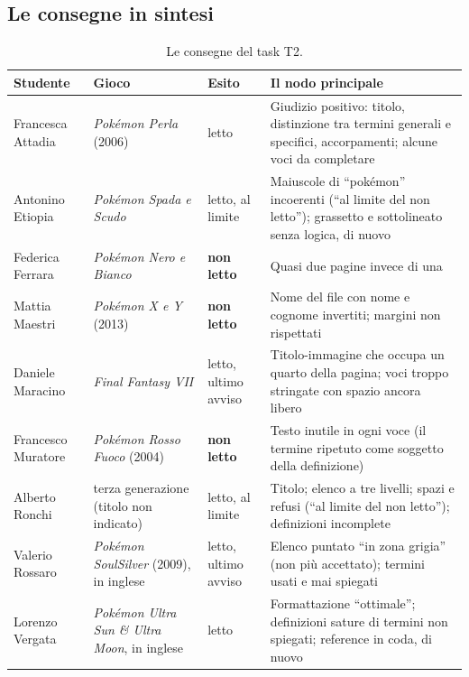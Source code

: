\subsection{Le consegne in sintesi}

\begin{table}[htbp]
  \centering
  \caption{Le consegne del task T2.}
  \label{rv:t2:tab:consegne}
  \small
  \begin{tabular}{@{}p{2.3cm}p{2.8cm}p{1.3cm}p{5.0cm}@{}}
    \toprule
    \textbf{Studente} & \textbf{Gioco} & \textbf{Esito} &
    \textbf{Il nodo principale} \\
    \midrule
    Francesca Attadia & \emph{Pokémon Perla} (2006) & letto &
      Giudizio positivo: titolo, distinzione tra termini generali e
      specifici, accorpamenti; alcune voci da completare \\
    \addlinespace
    Antonino Etiopia & \emph{Pokémon Spada e Scudo} & letto, al limite &
      Maiuscole di ``pokémon'' incoerenti (``al limite del non letto'');
      grassetto e sottolineato senza logica, di nuovo \\
    \addlinespace
    Federica Ferrara & \emph{Pokémon Nero e Bianco} & \textbf{non letto} &
      Quasi due pagine invece di una \\
    \addlinespace
    Mattia Maestri & \emph{Pokémon X e Y} (2013) & \textbf{non letto} &
      Nome del file con nome e cognome invertiti; margini non rispettati \\
    \addlinespace
    Daniele Maracino & \emph{Final Fantasy VII} & letto, ultimo avviso &
      Titolo-immagine che occupa un quarto della pagina; voci troppo
      stringate con spazio ancora libero \\
    \addlinespace
    Francesco Muratore & \emph{Pokémon Rosso Fuoco} (2004) &
      \textbf{non letto} & Testo inutile in ogni voce (il termine ripetuto
      come soggetto della definizione) \\
    \addlinespace
    Alberto Ronchi & terza generazione (titolo non indicato) & letto, al
      limite & Titolo; elenco a tre livelli; spazi e refusi (``al limite del
      non letto''); definizioni incomplete \\
    \addlinespace
    Valerio Rossaro & \emph{Pokémon SoulSilver} (2009), in inglese & letto,
      ultimo avviso & Elenco puntato ``in zona grigia'' (non più accettato);
      termini usati e mai spiegati \\
    \addlinespace
    Lorenzo Vergata & \emph{Pokémon Ultra Sun \& Ultra Moon}, in inglese &
      letto & Formattazione ``ottimale''; definizioni sature di termini non
      spiegati; reference in coda, di nuovo \\
    \bottomrule
  \end{tabular}
\end{table}

